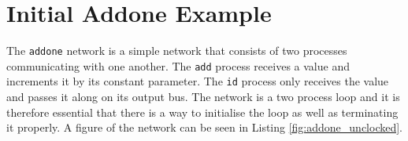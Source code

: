 %
%
%
%

%




\section{Initial Addone Example}
The \texttt{addone} network is a simple network that consists of two processes communicating with one another. The \texttt{add} process receives a value and increments it by its constant parameter. The \texttt{id} process only receives the value and passes it along on its output bus.
The network is a two process loop and it is therefore essential that there is a way to initialise the loop as well as terminating it properly.
A figure of the network can be seen in Listing \ref{fig:addone_unclocked}.\\

